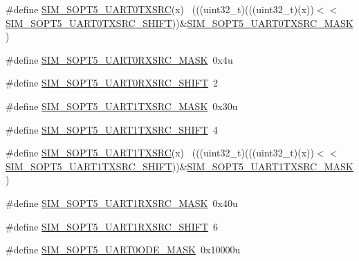\begin{DoxyCompactItemize}
\item 
\#define \hyperlink{group___s_i_m___register___masks_gaae8f435ecf7230b287a09bcb1bad59e0}{S\+I\+M\+\_\+\+S\+O\+P\+T5\+\_\+\+U\+A\+R\+T0\+T\+X\+S\+RC}(x)                                ~(((uint32\+\_\+t)(((uint32\+\_\+t)(x))$<$$<$\hyperlink{group___s_i_m___register___masks_ga0220b88df4a0747579d24b77f4db4e67}{S\+I\+M\+\_\+\+S\+O\+P\+T5\+\_\+\+U\+A\+R\+T0\+T\+X\+S\+R\+C\+\_\+\+S\+H\+I\+FT}))\&\hyperlink{group___s_i_m___register___masks_ga11646c1292cb7aab3128e1e563847e32}{S\+I\+M\+\_\+\+S\+O\+P\+T5\+\_\+\+U\+A\+R\+T0\+T\+X\+S\+R\+C\+\_\+\+M\+A\+SK})
\item 
\#define \hyperlink{group___s_i_m___register___masks_ga6160de3cd4b7169ac9095c0d0eee46f7}{S\+I\+M\+\_\+\+S\+O\+P\+T5\+\_\+\+U\+A\+R\+T0\+R\+X\+S\+R\+C\+\_\+\+M\+A\+SK}~0x4u
\item 
\#define \hyperlink{group___s_i_m___register___masks_ga27e87f2f792b880bd156907ab20e9910}{S\+I\+M\+\_\+\+S\+O\+P\+T5\+\_\+\+U\+A\+R\+T0\+R\+X\+S\+R\+C\+\_\+\+S\+H\+I\+FT}~2
\item 
\#define \hyperlink{group___s_i_m___register___masks_gac473b632c382f785d524c177ff186e0d}{S\+I\+M\+\_\+\+S\+O\+P\+T5\+\_\+\+U\+A\+R\+T1\+T\+X\+S\+R\+C\+\_\+\+M\+A\+SK}~0x30u
\item 
\#define \hyperlink{group___s_i_m___register___masks_ga7714c11e5536dacc90fbc2960e532e94}{S\+I\+M\+\_\+\+S\+O\+P\+T5\+\_\+\+U\+A\+R\+T1\+T\+X\+S\+R\+C\+\_\+\+S\+H\+I\+FT}~4
\item 
\#define \hyperlink{group___s_i_m___register___masks_ga06c2c7dfca35c10b5c05598c2c29e944}{S\+I\+M\+\_\+\+S\+O\+P\+T5\+\_\+\+U\+A\+R\+T1\+T\+X\+S\+RC}(x)                                ~(((uint32\+\_\+t)(((uint32\+\_\+t)(x))$<$$<$\hyperlink{group___s_i_m___register___masks_ga7714c11e5536dacc90fbc2960e532e94}{S\+I\+M\+\_\+\+S\+O\+P\+T5\+\_\+\+U\+A\+R\+T1\+T\+X\+S\+R\+C\+\_\+\+S\+H\+I\+FT}))\&\hyperlink{group___s_i_m___register___masks_gac473b632c382f785d524c177ff186e0d}{S\+I\+M\+\_\+\+S\+O\+P\+T5\+\_\+\+U\+A\+R\+T1\+T\+X\+S\+R\+C\+\_\+\+M\+A\+SK})
\item 
\#define \hyperlink{group___s_i_m___register___masks_gaf34eb14baf5894693130af7addd8aa6f}{S\+I\+M\+\_\+\+S\+O\+P\+T5\+\_\+\+U\+A\+R\+T1\+R\+X\+S\+R\+C\+\_\+\+M\+A\+SK}~0x40u
\item 
\#define \hyperlink{group___s_i_m___register___masks_ga098fcb3123342f9cd96869c69d2fb7a9}{S\+I\+M\+\_\+\+S\+O\+P\+T5\+\_\+\+U\+A\+R\+T1\+R\+X\+S\+R\+C\+\_\+\+S\+H\+I\+FT}~6
\item 
\#define \hyperlink{group___s_i_m___register___masks_ga85d9af0e8b110779992162a6820b5358}{S\+I\+M\+\_\+\+S\+O\+P\+T5\+\_\+\+U\+A\+R\+T0\+O\+D\+E\+\_\+\+M\+A\+SK}~0x10000u

\end{DoxyCompactItemize}
